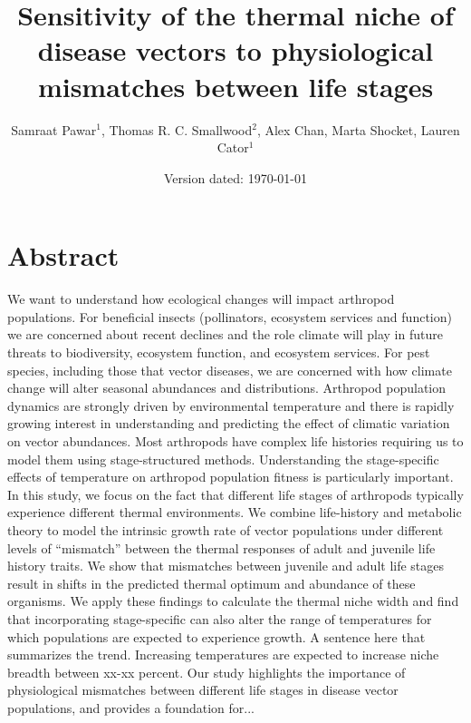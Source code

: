 

\title{Sensitivity of the thermal niche of disease vectors to physiological mismatches between life stages}

\author{Samraat Pawar$^1$, Thomas R. C. Smallwood$^2$, Alex Chan, Marta Shocket, Lauren Cator$^1$}


\date{Version dated: \today}




\maketitle


\section*{Abstract}

We want to understand how ecological changes will impact arthropod populations. For beneficial insects (pollinators, ecosystem services and function) we are concerned about recent declines and the role climate will play in future threats to biodiversity, ecosystem function, and ecosystem services. For pest species, including those that vector diseases, we are concerned with how climate change will alter seasonal abundances and distributions.  Arthropod population dynamics are strongly driven by environmental temperature and there is rapidly growing interest in understanding and predicting the effect of climatic variation on vector abundances. Most arthropods have complex life histories requiring us to model them using stage-structured methods.  Understanding the stage-specific effects of temperature on arthropod population fitness is particularly important.  In this study, we focus on the fact that different life stages of arthropods typically experience different thermal environments. We combine life-history and metabolic theory to model the intrinsic growth rate of vector populations under different levels of ``mismatch'' between the thermal responses of adult and juvenile life history traits. We show that mismatches between juvenile and adult life stages result in shifts in the predicted thermal optimum and abundance of these organisms. We apply these findings to calculate the thermal niche width and find that incorporating stage-specific can also alter the range of temperatures for which populations are expected to experience growth. A sentence here that summarizes the trend. Increasing temperatures are expected to increase niche breadth between xx-xx percent. Our study highlights the importance of physiological mismatches between different life stages in disease vector populations, and provides a foundation for...


